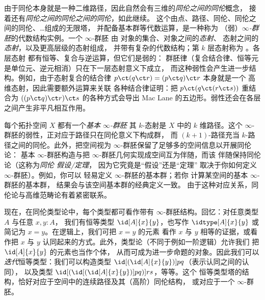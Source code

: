 由于同伦本身就是一种二维路径，因此自然会有三维的\emph{同伦之间的同伦}概念，
接着还有\emph{同伦之间的同伦之间的同伦}，如此继续。
这个由点、路径、同伦、同伦之间的同伦、\ldots 组成的无限塔，
并配备基本群等代数运算，是一种称为
（弱）\emph{$\infty$-群胚}的代数结构实例。一个 $\infty$-群胚 由
对象的集合、对象之间的\emph{态射}、
态射之间的\emph{态射}，以及更高层级的态射组成，
并带有复杂的代数结构；第 $k$ 层态射称为 。各层态射
都有恒等、复合与逆运算，但它们是弱的：
群胚律（复合结合律、恒等元是单位元、逆元相消）只在下一层态射意义下成立，
而这种弱性会产生进一步结构。例如，由于态射复合的结合律
$p \ct (q \ct r) = (p \ct q) \ct r$ 本身就是一个
高维态射，因此需要额外运算来关联
各种结合律证明：把 $p \ct
(q \ct (r \ct s))$ 重结合为 $((p \ct q) \ct r) \ct s$ 的各种方式会导出 Mac
Lane 的五边形。弱性还会在各层之间产生非平凡相互作用。

每个拓扑空间 $X$ 都有一个\emph{基本 $\infty$-群胚}
其
$k$-态射是 $X$ 中的 $k$ 维路径。这个
$\infty$-群胚的弱性，正对应于路径只在同伦意义下构成群，
而 $(k+1)$-路径充当 $k$-路径之间的同伦。此外，把空间视为
$\infty$-群胚保留了足够多的空间信息以开展同伦论：
基本 $\infty$-群胚构造与把 $\infty$-群胚几何实现成空间互为伴随，而该
伴随保持同伦论（这称为\emph{同伦
假设/定理}，
%
%
因为它究竟是“假设”还是“定理”
取决于你如何定义 $\infty$-群胚）。例如，你可以
轻易定义 $\infty$-群胚的基本群；若你
计算某空间的基本 $\infty$-群胚的基本群，
结果会与该空间基本群的经典定义一致。
由于这种对应关系，同伦论与高维范畴论有着紧密联系。

%
%

\mentalpause

现在，在同伦类型论中，每个类型都可看作带有
$\infty$-群胚结构。回忆：对任意类型 $A$ 与任意 $x,y:A$，
我们有恒等类型 $\id[A]{x}{y}$，也写作 $\idtype[A]{x}{y}$
或简记为 $x=y$。在逻辑上，我们可把 $x=y$ 的元素
看作 $x$ 与 $y$ 相等的证据，或看作把 $x$ 与
$y$ 认同起来的方式。此外，类型论（不同于例如一阶逻辑）允许我们
把 $\id[A]{x}{y}$ 的元素也当作个体，
从而可成为进一步命题的对象。因此我们可以
\emph{迭代}恒等类型：我们可以构造类型
$\id[{(\id[A]{x}{y})}]{p}{q}$（表示认同之间的认同），
以及类型
$\id[{(\id[{(\id[A]{x}{y})}]{p}{q})}]{r}{s}$，等等。这个
恒等类型塔的结构，恰好对应于空间中的连续路径及其（高阶）同伦结构，
或对应于一个
$\infty$-群胚。


